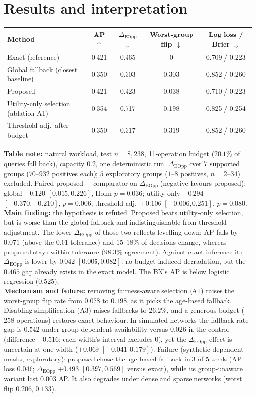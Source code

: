 \documentclass[11pt,a4paper]{article}
\begin{document}
\section{Results and interpretation}
\begin{center}\small
\begin{tabularx}{\linewidth}{Xcccc}\toprule
Method & AP $\uparrow$ & $\Delta_{\mathrm{EOpp}}$ $\downarrow$ & Worst-group flip $\downarrow$ & Log loss / Brier $\downarrow$\\\midrule
Exact (reference) & 0.421 & 0.465 & 0 & 0.709 / 0.223\\
Global fallback (closest baseline) & 0.350 & 0.303 & 0.303 & 0.852 / 0.260\\
Proposed & 0.421 & 0.423 & 0.038 & 0.710 / 0.223\\
Utility-only selection (ablation A1) & 0.354 & 0.717 & 0.198 & 0.825 / 0.254\\
Threshold adj.\ after budget & 0.350 & 0.317 & 0.319 & 0.852 / 0.260\\\bottomrule
\end{tabularx}
\end{center}
{\small \textbf{Table note:} natural workload, test $n=8{,}238$, 11-operation budget ($20.1\%$ of queries fall back), capacity $0.2$, one deterministic run. $\Delta_{\mathrm{EOpp}}$ over $7$ supported groups ($70$--$932$ positives each); $5$ exploratory groups ($1$--$8$ positives, $n=2$--$34$) excluded. Paired proposed $-$ comparator on $\Delta_{\mathrm{EOpp}}$ (negative favours proposed): global $+0.120$ $[0.015,0.226]$, Holm $p=0.036$; utility-only $-0.294$ $[-0.370,-0.210]$, $p=0.006$; threshold adj.\ $+0.106$ $[-0.006,0.251]$, $p=0.080$.}\\
\textbf{Main finding:} the hypothesis is refuted. Proposed beats utility-only selection, but is worse than the global fallback and indistinguishable from threshold adjustment. The lower $\Delta_{\mathrm{EOpp}}$ of those two reflects levelling down: AP falls by $0.071$ (above the $0.01$ tolerance) and $15$--$18\%$ of decisions change, whereas proposed stays within tolerance ($98.3\%$ agreement). Against exact inference its $\Delta_{\mathrm{EOpp}}$ is lower by $0.042$ $[0.006,0.082]$: no budget-induced degradation, but the $0.465$ gap already exists in the exact model. The BN's AP is below logistic regression ($0.525$).\\
\textbf{Mechanism and failure:} removing fairness-aware selection (A1) raises the worst-group flip rate from $0.038$ to $0.198$, as it picks the age-based fallback. Disabling simplification (A3) raises fallbacks to $26.2\%$, and a generous budget ($258$ operations) restores exact behaviour. In simulated networks the fallback-rate gap is $0.542$ under group-dependent availability versus $0.026$ in the control (difference $+0.516$; each width's interval excludes $0$), yet the $\Delta_{\mathrm{EOpp}}$ effect is uncertain at one width ($+0.069$ $[-0.041,0.179]$). Failure (synthetic dependent masks, exploratory): proposed chose the age-based fallback in $3$ of $5$ seeds (AP loss $0.046$; $\Delta_{\mathrm{EOpp}}$ $+0.493$ $[0.397,0.569]$ versus exact), while its group-unaware variant lost $0.003$ AP. It also degrades under dense and sparse networks (worst flip $0.206$, $0.133$).
\end{document}
